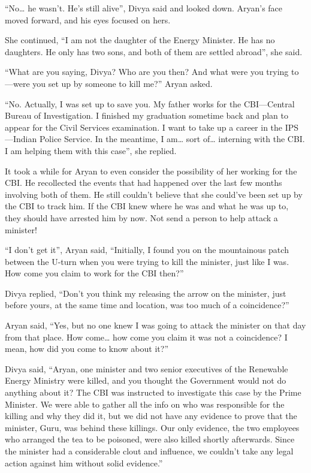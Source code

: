 “No… he wasn't. He's still alive”, Divya said and looked down. Aryan's face
moved forward, and his eyes focused on hers.

She continued, “I am not the daughter of the Energy Minister. He has no
daughters. He only has two sons, and both of them are settled abroad”, she said.

“What are you saying, Divya? Who are you then? And what were you trying to—were
you set up by someone to kill me?” Aryan asked.

“No. Actually, I was set up to save you. My father works for the CBI—Central
Bureau of Investigation. I finished my graduation sometime back and plan to
appear for the Civil Services examination. I want to take up a career in the 
IPS—Indian Police Service. In the meantime, I am… sort of… interning with
the CBI. I am helping them with this case”, she replied.

It took a while for Aryan to even consider the possibility of her working for
the CBI. He recollected the events that had happened over the last few months
involving both of them. He still couldn't believe that she could've been set up
by the CBI to track him. If the CBI knew where he was and what he was up to,
they should have arrested him by now. Not send a person to help attack a
minister!

“I don't get it”, Aryan said, “Initially, I found you on the mountainous patch
between the U-turn when you were trying to kill the minister, just like I was.
How come you claim to work for the CBI then?”

Divya replied, “Don't you think my releasing the arrow on the minister, just
before yours, at the same time and location, was too much of a coincidence?”

Aryan said, “Yes, but no one knew I was going to attack the minister on that day
from that place. How come… how come you claim it was not a coincidence? I
mean, how did you come to know about it?”

Divya said, “Aryan, one minister and two senior executives of the Renewable
Energy Ministry were killed, and you thought the Government would not do
anything about it? The CBI was instructed to investigate this case by the Prime
Minister. We were able to gather all the info on who was responsible for the
killing and why they did it, but we did not have any evidence to prove that the
minister, Guru, was behind these killings. Our only evidence, the two employees
who arranged the tea to be poisoned, were also killed shortly afterwards. Since
the minister had a considerable clout and influence, we couldn't take any legal
action against him without solid evidence.”

